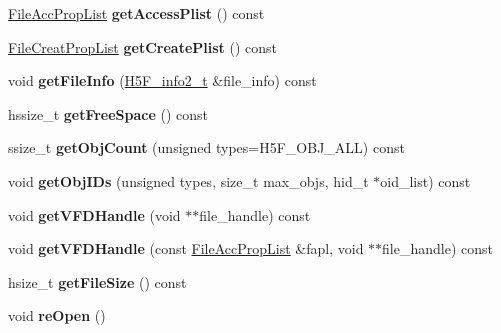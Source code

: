 \begin{DoxyCompactItemize}
\hyperlink{class_h5_1_1_file_acc_prop_list}{File\+Acc\+Prop\+List} {\bfseries get\+Access\+Plist} () const
\item 
\mbox{\label{class_h5_1_1_h5_file_a8270a0bd23800aa05d3d12951ee40e64}} 
\hyperlink{class_h5_1_1_file_creat_prop_list}{File\+Creat\+Prop\+List} {\bfseries get\+Create\+Plist} () const
\item 
\mbox{\label{class_h5_1_1_h5_file_a7d1aa654f620e47e0283cd087f850594}} 
void {\bfseries get\+File\+Info} (\hyperlink{struct_h5_f__info2__t}{H5\+F\+\_\+info2\+\_\+t} \&file\+\_\+info) const
\item 
\mbox{\label{class_h5_1_1_h5_file_a76ae0346b2dc80b8317cd2a40d47f552}} 
hssize\+\_\+t {\bfseries get\+Free\+Space} () const
\item 
\mbox{\label{class_h5_1_1_h5_file_ab318fe48af16bf1f15d4ef81bcb5dfac}} 
ssize\+\_\+t {\bfseries get\+Obj\+Count} (unsigned types=H5\+F\+\_\+\+O\+B\+J\+\_\+\+A\+LL) const
\item 
\mbox{\label{class_h5_1_1_h5_file_a062247a9f98d83036113b0117531e537}} 
void {\bfseries get\+Obj\+I\+Ds} (unsigned types, size\+\_\+t max\+\_\+objs, hid\+\_\+t $\ast$oid\+\_\+list) const
\item 
\mbox{\label{class_h5_1_1_h5_file_a99945ff273f5d8298dc673f46edf4dcd}} 
void {\bfseries get\+V\+F\+D\+Handle} (void $\ast$$\ast$file\+\_\+handle) const
\item 
\mbox{\label{class_h5_1_1_h5_file_a4480c9a251b5a6a19bccbc4f58e5ee65}} 
void {\bfseries get\+V\+F\+D\+Handle} (const \hyperlink{class_h5_1_1_file_acc_prop_list}{File\+Acc\+Prop\+List} \&fapl, void $\ast$$\ast$file\+\_\+handle) const
\item 
\mbox{\label{class_h5_1_1_h5_file_a9f85949a9bcf97244244b272f1209d4f}} 
hsize\+\_\+t {\bfseries get\+File\+Size} () const
\item 
\mbox{\label{class_h5_1_1_h5_file_af3f5bdd07e7b26a6090ff8361df80498}} 
void {\bfseries re\+Open} ()
\item 

\end{DoxyCompactItemize}
